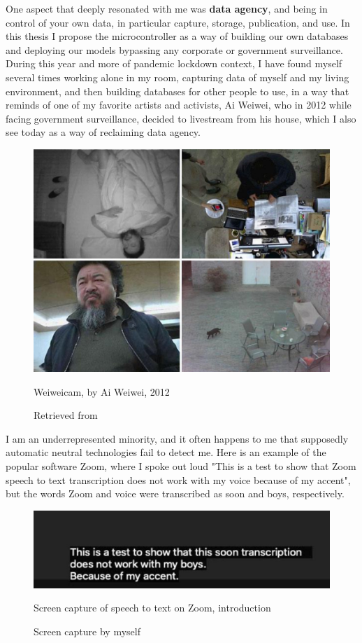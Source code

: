 One aspect that deeply resonated with me was \textbf{data agency}, and being in control of your own data, in particular capture, storage, publication, and use. In this thesis I propose the microcontroller as a way of building our own databases and deploying our models bypassing any corporate or government surveillance. During this year and more of pandemic lockdown context, I have found myself several times working alone in my room, capturing data of myself and my living environment, and then building databases for other people to use, in a way that reminds of one of my favorite artists and activists, Ai Weiwei, who in 2012 while facing government surveillance, decided to livestream from his house, which I also see today as a way of reclaiming data agency.

\begin{figure}[ht]
  \centering
  \includegraphics[width=0.75\linewidth,height=0.25\textheight,keepaspectratio]{images/weiweicam.jpg}
  \caption{Weiweicam, by Ai Weiwei, 2012}
  \caption*{Retrieved from \cite{website-forbes-ai-weiwei-cam}}
  \label{fig:weiweicam}
\end{figure}

I am an underrepresented minority, and it often happens to me that supposedly automatic neutral technologies fail to detect me. Here is an example of the popular software Zoom, where I spoke out loud "This is a test to show that Zoom speech to text transcription does not work with my voice because of my accent", but the words Zoom and voice were transcribed as soon and boys, respectively.

\begin{figure}[ht]
  \centering
  \includegraphics[width=0.75\linewidth,height=0.25\textheight,keepaspectratio]{images/zoom-introduction.jpg}
  \caption{Screen capture of speech to text on Zoom, introduction}
  \caption*{Screen capture by myself}
  \label{fig:zoom-voice}
\end{figure}

